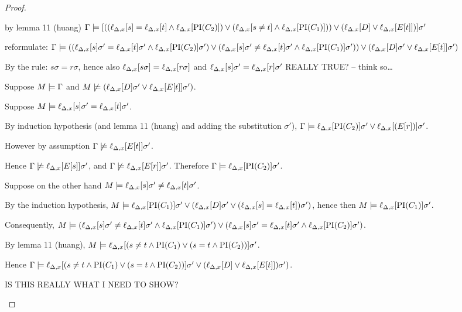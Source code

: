 \documentclass[,%
	paper=a4,%
	DIV14, 
	liststotoc,
	bibtotoc,
	draft=false,%
	numbers=noendperiod
]{scrartcl}
\newcommand{\lif}[1]{\lift{\Delta}{#1}{x}}
\begin{document}
\begin{proof}
\begin{description}
			by lemma 11 (huang)
			$\Gamma \entails [((\lif{s}=\lif{t} \land \lif{\PI(C_2)} ) \lor (\lif{s\neq t} \land \lif{\PI(C_1)})) \lor (\lif{D} \lor \lif{E[t]}) ]\sigma' $

			reformulate:
			$\Gamma \entails ((\lif{s}\sigma'=\lif{t}\sigma' \land \lif{\PI(C_2)}\sigma' ) \lor (\lif{s}\sigma'\neq \lif{t}\sigma' \land \lif{\PI(C_1)}\sigma')) \lor (\lif{D}\sigma' \lor \lif{E[t]}\sigma') $

			By the rule: $s\sigma = r\sigma$, hence also $\lif{s\sigma} = \lif{r\sigma}$ and $\lif{s}\sigma' = \lif{r}\sigma'$ REALLY TRUE? -- think so\dots

			Suppose $M \models \Gamma$ and $M \not \entails (\lif{D}\sigma' \lor \lif{E[t]}\sigma') $.

			Suppose $M \entails \lif{s}\sigma' = \lif{t}\sigma'$.

			By induction hypothesis (and lemma 11 (huang) and adding the substitution $\sigma'$), 
			$\Gamma \entails \lif{\PI(C_2)}\sigma' \lor \lif{(E[r])}\sigma'$.

			However by assumption $\Gamma \not \entails \lif{E[t]}\sigma'$.

			Hence $\Gamma \not \entails \lif{E[s]}\sigma'$, and
			$\Gamma \not \entails \lif{E[r]}\sigma'$. Therefore $\Gamma \entails \lif{\PI(C_2)}\sigma'$.


			Suppose on the other hand $M \entails \lif{s}\sigma' \neq \lif{t}\sigma'$.

			By the induction hypothesis, 
			$M \entails \lif{\PI(C_1)}\sigma' \lor (\lif{D}\sigma'\lor (\lif{s}=\lif{t})\sigma')$,
			hence then $M \entails \lif{\PI(C_1)}\sigma'$.

			Consequently, 
			$M \entails (\lif{s}\sigma' \neq \lif{t}\sigma' \land \lif{\PI(C_1)}\sigma') \lor (\lif{s}\sigma' = \lif{t}\sigma' \land \lif{\PI(C_2)}\sigma')$.

			By lemma 11 (huang), 
			$M \entails \lif{(s \neq {t} \land {\PI(C_1)} \lor ({s} = {t} \land \PI(C_2))}\sigma'$.

			Hence 
			$\Gamma \entails \lif{(s \neq {t} \land {\PI(C_1)} \lor ({s} = {t} \land \PI(C_2))}\sigma' \lor (\lif{D} \lor \lif{E[t]})\sigma') $.

			IS THIS REALLY WHAT I NEED TO SHOW?


	\end{description}
\end{proof}
\end{document}
